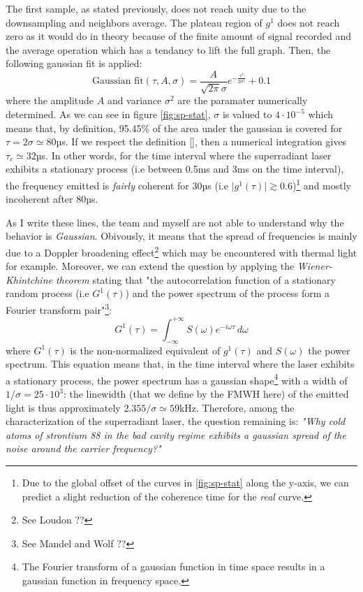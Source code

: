 \documentclass[11pt]{report}
\begin{document}
The first sample, as stated previously, does not reach unity due to the downsampling and neighbors average. The plateau region of $g^1$ does not reach zero as it would do in theory because of the finite amount of signal recorded and the average operation which has a tendancy to lift the full graph. Then, the following gaussian fit is applied:
\begin{equation}
\textrm{Gaussian fit}(\tau, A, \sigma) = \frac{A}{\sqrt{2\pi}\sigma} e^{-\frac{\tau^2}{2\sigma^2}} + 0.1
\end{equation}
where the amplitude $A$ and variance $\sigma^2$ are the paramater numerically determined. As we can see in figure \ref{fig:sp-stat}, $\sigma$ is valued to $4\cdot10^{-5}$ which means that, by definition, 95.45\% of the area under the gaussian is covered for $\tau=2\sigma\simeq 80$µs. If we respect the definition \ref{}, then a numerical integration gives $\tau_c \simeq 32$µs. In other words, for the time interval where the superradiant laser exhibits a stationary process (i.e between 0.5ms and 3ms on the time interval), the frequency emitted is \textit{fairly} coherent for 30µs (i.e $\vert g^1(\tau) \vert \gtrsim 0.6$)\footnote{Due to the global offset of the curves in \ref{fig:sp-stat} along the y-axis, we can predict a slight reduction of the coherence time for the \textit{real} curve.} and mostly incoherent after 80µs.

As I write these lines, the team and myself are not able to understand why the behavior is \textit{Gaussian}. Obivously, it means that the spread of frequencies is mainly due to a Doppler broadening effect\footnote{See Loudon ??} which may be encountered with thermal light for example. Moreover, we can extend the question by applying the \textit{Wiener-Khintchine theorem} stating that "the autocorrelation function of a stationary random process (i.e $G^1(\tau)$) and the power spectrum of the process form a Fourier transform pair"\footnote{See Mandel and Wolf ??}:
\begin{equation}
G^1(\tau) = \int_{-\infty}^{+\infty} S(\omega) e^{-i\omega\tau} \,d\omega
\end{equation}
where $G^1(\tau)$ is the non-normalized equivalent of $g^1(\tau)$ and $S(\omega)$ the power spectrum. This equation means that, in the time interval where the laser exhibits a stationary process, the power spectrum has a gaussian shape\footnote{The Fourier transform of a gaussian function in time space results in a gaussian function in frequency space.} with a width of $1/\sigma = 25\cdot 10^{3}$: the linewidth (that we define by the FMWH here) of the emitted light is thus approximately $2.355/\sigma \simeq 59$kHz. Therefore, among the characterization of the superradiant laser, the question remaining is: \textit{"Why cold atoms of strontium 88 in the bad cavity regime exhibits a gaussian spread of the noise around the carrier frequency?"}
\end{document}
